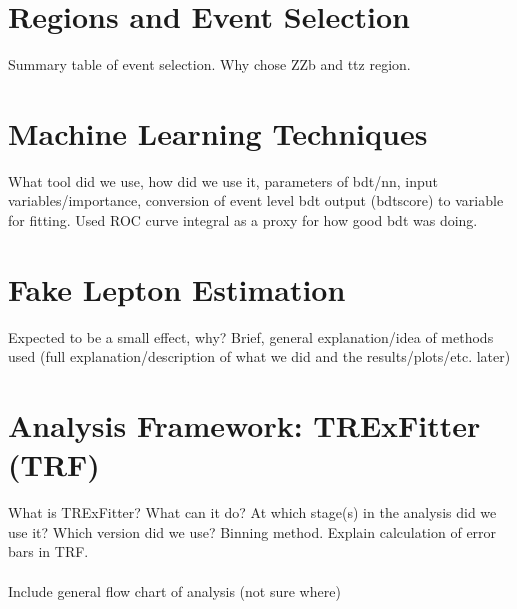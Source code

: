 \section{Regions and Event Selection}

Summary table of event selection. Why chose ZZb and ttz region. 
\section{Machine Learning Techniques}
What tool did we use, how did we use it, parameters of bdt/nn, input variables/importance, conversion of event level bdt output (bdtscore) to variable for fitting. Used ROC curve integral as a proxy for how good bdt was doing. 
\section{Fake Lepton Estimation} 
Expected to be a small effect, why? Brief, general explanation/idea of methods used (full explanation/description of what we did and the results/plots/etc. later) 
\section{Analysis Framework: TRExFitter (TRF)}
What is TRExFitter? What can it do? At which stage(s) in the analysis did we use it? Which version did we use? Binning method. Explain calculation of error bars in TRF. \\\\ 
Include general flow chart of analysis (not sure where)








